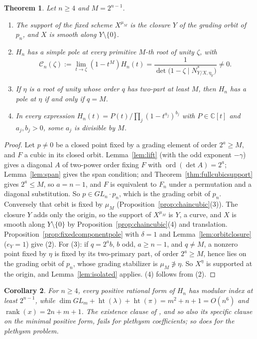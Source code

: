 \documentclass[11pt,a4paper]{article}
\newtheorem{theorem}{Theorem}[section]
\newtheorem{corollary}[theorem]{Corollary}
\theoremstyle{definition}
\newcommand{\C}{\mathbb{C}}
\newcommand{\ord}{\operatorname{ord}}
\newcommand{\rank}{\operatorname{rank}}
\begin{document}
\begin{theorem}\label{thm:plethysmPH3}
Let $n\ge4$ and $M=2^{n-1}$.
\begin{enumerate}
\item The support of the fixed scheme $X^{\mu_M}$ is the closure $Y$ of the
grading orbit of $p_n$, and $X$ is smooth along $Y\setminus\{0\}$.
\item $H_n$ has a simple pole at every primitive $M$-th root of unity $\zeta$,
with
\begin{equation}\label{eq:plethysmresidue}
 \mathcal C_n(\zeta):=\lim_{t\to\zeta}(1-t^M)H_n(t)
 =\frac1{\det\bigl(1-\zeta\mid N^*_{Y/X,\eta_Y}\bigr)}\ne0 .
\end{equation}
\item If $\eta$ is a root of unity whose order $q$ has two-part at least $M$,
then $H_n$ has a pole at $\eta$ if and only if $q=M$.
\item In every expression $H_n(t)=P(t)/\prod_j(1-t^{a_j})^{b_j}$ with
$P\in\C[t]$ and $a_j,b_j>0$, some $a_j$ is divisible by $M$.
\end{enumerate}
\end{theorem}

\begin{proof}
Let $p\ne0$ be a closed point fixed by a grading element of order $2^a\ge M$,
and $F$ a cubic in its closed orbit. Lemma~\ref{lem:lift} (with the odd
exponent $-\gamma$) gives a diagonal $A$ of two-power order fixing $F$ with
$\ord(\det A)=2^a$; Lemma~\ref{lem:span} gives the span condition; and
Theorem~\ref{thm:fullcubicsupport} gives $2^a\le M$, so $a=n-1$, and $F$ is
equivalent to $F_n$ under a permutation and a diagonal substitution. So
$p\in GL_n\cdot p_n$, which is the grading orbit of $p_n$. Conversely that
orbit is fixed by $\mu_M$ (Proposition~\ref{prop:chaincubic}(3)). The closure
$Y$ adds only the origin, so the support of $X^{\mu_M}$ is $Y$, a curve, and
$X$ is smooth along $Y\setminus\{0\}$ by Proposition~\ref{prop:chaincubic}(4)
and translation. Proposition~\ref{prop:fixedcomponentpole} with $\delta=1$ and
Lemma~\ref{lem:orbitclosure} ($e_Y=1$) give (2). For (3): if $q=2^ab$, $b$ odd,
$a\ge n-1$, and $q\ne M$, a nonzero point fixed by $\eta$ is fixed by its
two-primary part, of order $2^a\ge M$, hence lies on the grading orbit of
$p_n$, whose grading stabilizer is $\mu_M\not\ni\eta$. So $X^\eta$ is supported
at the origin, and Lemma~\ref{lem:isolated} applies. (4) follows from (2).
\end{proof}

\begin{corollary}\label{cor:plethysmPH3}
For $n\ge4$, every positive rational form of $H_n$ has modular index at least
$2^{n-1}$, while $\dim GL_m+\operatorname{ht}(\lambda)+\operatorname{ht}(\pi)
=m^2+n+1=O(n^6)$ and $\rank(x)=2n+m+1$. The existence clause of
\cite[Hypothesis 1.6.7]{GCT6}, and so also its specific clause on the minimal
positive form, fails for plethysm coefficients; so does
\cite[Hypothesis 3.3.4]{GCT6} for the plethysm problem.
\end{corollary}
\end{document}

